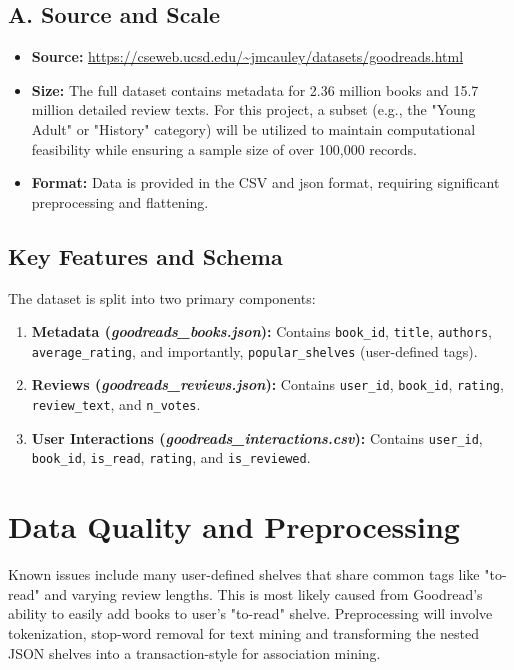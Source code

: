 \documentclass[conference]{IEEEtran}
\begin{document}
\subsection{A. Source and Scale }
\begin{itemize}
    \item \textbf{Source:} \url{https://cseweb.ucsd.edu/~jmcauley/datasets/goodreads.html}
    \item \textbf{Size:} The full dataset contains metadata for 2.36 million books and 15.7 million detailed review texts. For this project, a subset (e.g., the "Young Adult" or "History" category) will be utilized to maintain computational feasibility while ensuring a sample size of over 100,000 records.
    \item \textbf{Format:} Data is provided in the CSV and json format, requiring significant preprocessing and flattening.
\end{itemize}

\subsection{Key Features and Schema}
The dataset is split into two primary components:
\begin{enumerate}
    \item \textbf{Metadata (\textit{goodreads\_books.json}):} Contains \texttt{book\_id}, \texttt{title}, \texttt{authors}, \texttt{average\_rating}, and importantly, \texttt{popular\_shelves} (user-defined tags).

    \item \textbf{Reviews (\textit{goodreads\_reviews.json}):} Contains \texttt{user\_id}, \texttt{book\_id}, \texttt{rating}, \texttt{review\_text}, and \texttt{n\_votes}.
    \item \textbf{User Interactions (\textit{goodreads\_interactions.csv}):} Contains \texttt{user\_id}, \texttt{book\_id}, \texttt{is\_read}, \texttt{rating}, and \texttt{is\_reviewed}.
\end{enumerate}


\section{Data Quality and Preprocessing}

Known issues include many user-defined shelves that share common tags like "to-read" and varying review lengths. This is most likely caused from Goodread's ability to easily add books to user's "to-read" shelve. Preprocessing will involve tokenization, stop-word removal for text mining and transforming the nested JSON shelves into a transaction-style for association mining.
\end{document}
